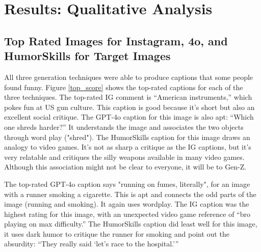 \section{Results: Qualitative Analysis}



\subsection{Top Rated Images for Instagram, 4o, and HumorSkills for Target Images}

All three generation techniques were able to produce captions that some people found funny. Figure \ref{top_score} shows the top-rated captions for each of the three techniques. 
The top-rated IG comment is “American instruments,” which pokes fun at US gun culture. This caption is good because it's short but also an excellent social critique. The GPT-4o caption for this image is also apt: “Which one shreds harder?” It understands the image and associates the two objects through word play ("shred"). The HumorSkills caption for this image draws an analogy to video games. It's not as sharp a critique as the IG captions, but it's very relatable and critiques the silly weapons available in many video games. Although this association might not be clear to everyone, it will be to Gen-Z.


The top-rated GPT-4o caption says "running on fumes, literally", for an image with a runner smoking a cigarette. This is apt and connects the odd parts of the image (running and smoking). It again uses wordplay. 
The IG caption was the highest rating for this image, with an unexpected video game reference of ``bro playing on max difficulty.''
The HumorSkills caption did least well for this image, it uses dark humor to critique the runner for smoking and point out the absurdity: “They really said ‘let’s race to the hospital.’” 


